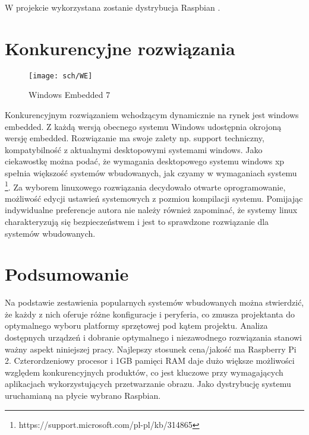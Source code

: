 W projekcie wykorzystana zostanie dystrybucja Raspbian .

\section{Konkurencyjne rozwiązania}

\begin{figure}[bth]
\centering
{\texttt{[image: sch/WE]}}
\caption[Windows Embedded 7]{Windows Embedded 7}
\label{fig:sch1}
\end{figure}

Konkurencyjnym rozwiązaniem wchodzącym dynamicznie na rynek jest windows embedded.  Z każdą wersją obecnego systemu Windows udostępnia okrojoną wersję embedded. Rozwiązanie ma swoje zalety np. support techniczny, kompatybilność z aktualnymi desktopowymi systemami windows. Jako ciekawostkę można podać, że wymagania desktopowego systemu windows xp spełnia większość systemów wbudowanych, jak czyamy w wymaganiach systemu \footnote{https://support.microsoft.com/pl-pl/kb/314865}. Za wyborem linuxowego rozwiązania decydowało otwarte oprogramowanie, możliwość edycji ustawień systemowych z pozmiou kompilacji systemu. Pomijając indywidualne preferencje autora nie należy również zapominać, że systemy linux charakteryzują się bezpieczeństwem i jest to sprawdzone rozwiązanie dla systemów wbudowanych.

\section{Podsumowanie}
Na podstawie zestawienia popularnych systemów wbudowanych można stwierdzić, że każdy z nich oferuje różne konfiguracje i peryferia, co zmusza projektanta do optymalnego wyboru platformy sprzętowej pod kątem projektu. Analiza dostępnych urządzeń i dobranie optymalnego i niezawodnego rozwiązania stanowi ważny aspekt niniejszej pracy.
Najlepszy stosunek cena/jakość ma  Raspberry Pi 2. Czterordzeniowy procesor i 1GB pamięci RAM daje dużo większe możliwości względem konkurencyjnych produktów, co jest kluczowe przy  wymagających aplikacjach wykorzystujących przetwarzanie obrazu.
Jako dystrybucję systemu uruchamianą na płycie wybrano Raspbian.

